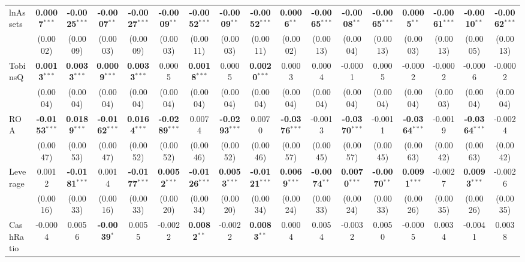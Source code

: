 \begin{landscape}
\begin{table}[H]
\begin{tabular}{lcccccccccccccccc}
\midrule
lnAssets & \textbf{0.0007}$^{***}$ & \textbf{-0.0025}$^{***}$ & \textbf{-0.0007}$^{**}$ & \textbf{-0.0027}$^{***}$ & \textbf{-0.0009}$^{**}$ & \textbf{-0.0052}$^{***}$ & \textbf{-0.0009}$^{**}$ & \textbf{-0.0052}$^{***}$ & \textbf{0.0006}$^{**}$ & \textbf{-0.0065}$^{***}$ & \textbf{-0.0008}$^{**}$ & \textbf{-0.0065}$^{***}$ & \textbf{0.0005}$^{**}$ & \textbf{-0.0061}$^{***}$ & \textbf{-0.0010}$^{**}$ & \textbf{-0.0062}$^{***}$ \\
 & (0.0002) & (0.0009) & (0.0003) & (0.0009) & (0.0003) & (0.0011) & (0.0003) & (0.0011) & (0.0002) & (0.0013) & (0.0004) & (0.0013) & (0.0003) & (0.0013) & (0.0005) & (0.0013) \\
TobinsQ & \textbf{0.0013}$^{***}$ & \textbf{0.0033}$^{***}$ & \textbf{0.0009}$^{***}$ & \textbf{0.0033}$^{***}$ & 0.0005 & \textbf{0.0018}$^{***}$ & 0.0005 & \textbf{0.0020}$^{***}$ & 0.0003 & 0.0004 & -0.0001 & 0.0005 & -0.0002 & -0.0002 & -0.0006 & -0.0002 \\
 & (0.0004) & (0.0004) & (0.0004) & (0.0004) & (0.0004) & (0.0004) & (0.0004) & (0.0004) & (0.0004) & (0.0004) & (0.0004) & (0.0004) & (0.0004) & (0.0003) & (0.0004) & (0.0004) \\
ROA & \textbf{-0.0153}$^{***}$ & \textbf{0.0189}$^{***}$ & \textbf{-0.0162}$^{***}$ & \textbf{0.0164}$^{***}$ & \textbf{-0.0289}$^{***}$ & 0.0074 & \textbf{-0.0293}$^{***}$ & 0.0070 & \textbf{-0.0376}$^{***}$ & -0.0013 & \textbf{-0.0370}$^{***}$ & -0.0011 & \textbf{-0.0364}$^{***}$ & -0.0019 & \textbf{-0.0364}$^{***}$ & -0.0024 \\
 & (0.0047) & (0.0053) & (0.0047) & (0.0052) & (0.0052) & (0.0046) & (0.0052) & (0.0046) & (0.0057) & (0.0045) & (0.0057) & (0.0045) & (0.0063) & (0.0042) & (0.0063) & (0.0042) \\
Leverage & 0.0012 & \textbf{-0.0181}$^{***}$ & 0.0014 & \textbf{-0.0177}$^{***}$ & \textbf{0.0052}$^{***}$ & \textbf{-0.0126}$^{***}$ & \textbf{0.0053}$^{***}$ & \textbf{-0.0121}$^{***}$ & \textbf{0.0069}$^{***}$ & \textbf{-0.0074}$^{**}$ & \textbf{0.0070}$^{***}$ & \textbf{-0.0070}$^{**}$ & \textbf{0.0091}$^{***}$ & -0.0027 & \textbf{0.0093}$^{***}$ & -0.0026 \\
 & (0.0016) & (0.0033) & (0.0016) & (0.0033) & (0.0020) & (0.0034) & (0.0020) & (0.0034) & (0.0024) & (0.0033) & (0.0024) & (0.0033) & (0.0026) & (0.0035) & (0.0026) & (0.0035) \\
CashRatio & -0.0004 & 0.0056 & \textbf{-0.0039}$^{*}$ & 0.0055 & -0.0022 & \textbf{0.0082}$^{**}$ & -0.0022 & \textbf{0.0083}$^{**}$ & 0.0004 & 0.0054 & -0.0032 & 0.0050 & -0.0005 & 0.0034 & -0.0041 & 0.0038 \\

\end{tabular}
\end{table}
\end{landscape}
